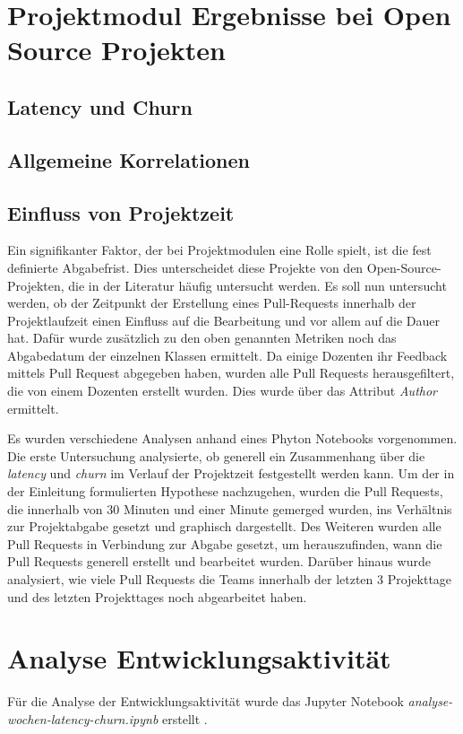 \section{Projektmodul Ergebnisse bei Open Source Projekten}
\subsection{Latency und Churn}
\subsection{Allgemeine Korrelationen}



\subsection{Einfluss von Projektzeit}
Ein signifikanter Faktor, der bei Projektmodulen eine Rolle spielt, ist die fest definierte Abgabefrist. Dies unterscheidet diese Projekte von den Open-Source-Projekten, die in der Literatur häufig untersucht werden. Es soll nun untersucht werden, ob der Zeitpunkt der Erstellung eines Pull-Requests innerhalb der Projektlaufzeit einen Einfluss auf die Bearbeitung und vor allem auf die Dauer hat. Dafür wurde zusätzlich zu den oben genannten Metriken noch das Abgabedatum der einzelnen Klassen ermittelt. Da einige Dozenten ihr Feedback mittels Pull Request abgegeben haben, wurden alle Pull Requests herausgefiltert, die von einem Dozenten erstellt wurden. Dies wurde über das Attribut \textit{Author} ermittelt.

Es wurden verschiedene Analysen anhand eines Phyton Notebooks vorgenommen. Die erste Untersuchung analysierte, ob generell ein Zusammenhang über die \textit{latency} und \textit{churn} im Verlauf der Projektzeit festgestellt werden kann.  Um der in der Einleitung formulierten Hypothese nachzugehen, wurden die Pull Requests, die innerhalb von 30 Minuten und einer Minute gemerged wurden, ins Verhältnis zur Projektabgabe gesetzt und graphisch dargestellt. Des Weiteren wurden alle Pull Requests in Verbindung zur Abgabe gesetzt, um herauszufinden, wann die Pull Requests generell erstellt und bearbeitet wurden.  Darüber hinaus wurde analysiert, wie viele Pull Requests die Teams innerhalb der letzten 3 Projekttage und des letzten Projekttages noch abgearbeitet haben.



\pagebreak
\section{Analyse Entwicklungsaktivität}
Für die Analyse der Entwicklungsaktivität wurde das Jupyter Notebook \textit{analyse-wochen-latency-churn.ipynb} erstellt \parencite{stumpf_simon_repo-detectivesba-metric-analysis-scripts_nodate}. 


